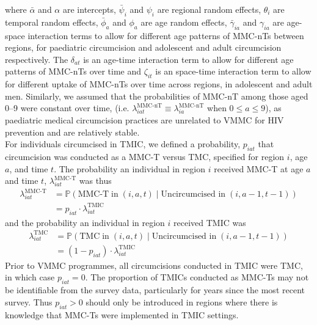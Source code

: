 \documentclass{article}
\begin{document}
\begin{appendix}
where $\bar{\alpha}$ and $\alpha$ are intercepts, $\bar{\psi}_i$ and $\psi_i$ are regional random effects, $\theta_i$ are temporal random effects, $\bar{\phi}_a$ and $\phi_a$ are age random effects, $\bar{\gamma}_{ia}$ and $\gamma_{ia}$ are age-space interaction terms to allow for different age patterns of MMC-nTs between regions, for paediatric circumcision and adolescent and adult circumcision respectively. The $\delta_{at}$ is an age-time interaction term to allow for different age patterns of MMC-nTs over time and $\zeta_{it}$ is an space-time interaction term to allow for different uptake of MMC-nTs over time across regions, in adolescent and adult men. Similarly, we assumed that the probabilities of MMC-nT among those aged 0--9 were constant over time, (i.e. $\lambda^{\text{MMC-nT}}_{iat} \equiv \lambda^{\text{MMC-nT}}_{ia}$ when $0\leq a \leq 9$), as paediatric medical circumcision practices are unrelated to VMMC for HIV prevention and are relatively stable. \\

\noindent For individuals circumcised in TMIC, we defined a probability, $p_{iat}$ that circumcision was conducted as a MMC-T versus TMC, specified for region $i$, age $a$, and time $t$. The probability an individual in region $i$ received MMC-T at age $a$ and time $t$, $\lambda^{\text{MMC-T}}_{iat}$ was thus 
\begin{equation}
	\begin{split}
		\lambda^{\text{MMC-T}}_{iat} &= \mathbb{P}(\text{MMC-T} \; \text{in} \; (i,a,t) \; | \; \text{Uncircumcised in} \; (i,a-1, t-1)) \\
		&=p_{iat}\cdot\lambda^{\text{TMIC}}_{iat}
	\end{split}
	\label{eqn::mmct}
\end{equation}
and  the probability an individual in region $i$ received TMIC was
\begin{equation}
	\begin{split}
		\lambda^{\text{TMC}}_{iat} &= \mathbb{P}(\text{TMC} \; \text{in} \; (i,a,t) \; | \; \text{Uncircumcised in} \; (i,a-1, t-1)) \\
		&=(1-p_{iat})\cdot\lambda^{\text{TMIC}}_{iat}
	\end{split}
	\label{eqn::tmc}
\end{equation}
Prior to VMMC programmes, all circumcisions conducted in TMIC were TMC, in which case $p_{iat}=0$. The proportion of TMICs conducted as MMC-Ts may not be identifiable from the survey data, particularly for years since the most recent survey. Thus $p_{iat}>0$ should only be introduced in regions where there is knowledge that MMC-Ts were implemented in TMIC settings. \\


\end{appendix}
\end{document}
